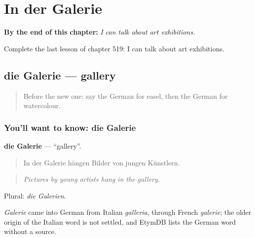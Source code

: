 
\chapter{In der Galerie}
\label{ch:ge-in-der-galerie}

\begin{chapteropening}
\textbf{By the end of this chapter:} \emph{I can talk about art exhibitions.}

Complete the last lesson of chapter 519: I can talk about art exhibitions.
\end{chapteropening}

\section[die Galerie]{die Galerie — gallery}

\label{lesson:GE-C519-galerie}



\begin{quote}
Before the new one: say the German for easel, then the German for watercolour.
\end{quote}

\subsection*{You'll want to know: die Galerie}
\textbf{die Galerie} — \textquotedblleft{}gallery\textquotedblright{}.

\begin{quote}
In der Galerie hängen Bilder von jungen Künstlern.
\end{quote}

\begin{quote}
\emph{Pictures by young artists hang in the gallery.}
\end{quote}

Plural: \emph{die Galerien}.

\begin{cousinweb}
\emph{Galerie} came into German from Italian \emph{galleria}, through French \emph{galerie}; the older origin of the Italian word is not settled, and EtymDB lists the German word without a source.
\end{cousinweb}

